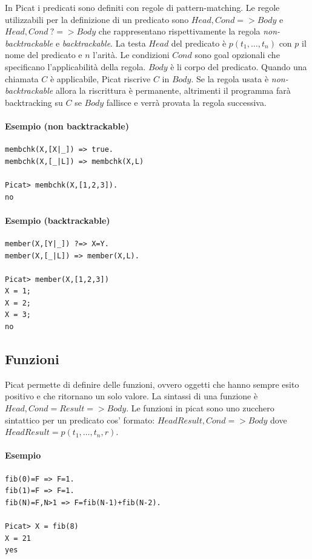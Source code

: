 \documentclass[12pt,a4paper,openright]{book} %
\begin{document}
In Picat i predicati sono definiti con regole di pattern-matching. Le regole utilizzabili per la definizione di un predicato sono $Head, Cond => Body$ e $Head, Cond\ ?=> Body$ che rappresentano rispettivamente la regola \emph{non-backtrackable} e \emph{backtrackable}. La testa $Head$ del predicato è $p(t_1, \ldots, t_n)$ con $p$ il nome del predicato e $n$ l'arità. Le condizioni $Cond$ sono goal opzionali che specificano l'applicabilità della regola. $Body$ è li corpo del predicato.
Quando una chiamata $C$ è applicabile, Picat riscrive $C$ in $Body$. Se la regola usata è \emph{non-backtrackable} allora la riscrittura è permanente, altrimenti il programma farà backtracking su $C$ se $Body$ fallisce e verrà provata la regola successiva.



\paragraph{Esempio (non backtrackable)}
\begin{verbatim}
membchk(X,[X|_]) => true.
membchk(X,[_|L]) => membchk(X,L)

Picat> membchk(X,[1,2,3]).
no
\end{verbatim}

\paragraph{Esempio (backtrackable)}
\begin{verbatim}
member(X,[Y|_]) ?=> X=Y.
member(X,[_|L]) => member(X,L).

Picat> member(X,[1,2,3])
X = 1;
X = 2;
X = 3;
no
\end{verbatim}

\subsection{Funzioni}
\label{sec:picat_base_func}

Picat permette di definire delle funzioni, ovvero oggetti che hanno sempre esito positivo e che ritornano un solo valore. La sintassi di una funzione è $Head, Cond = Result => Body$. Le funzioni in picat sono uno zucchero sintattico per un predicato cos' formato: $HeadResult, Cond => Body$ dove $HeadResult = p(t_1, \ldots, t_n, r)$.

\paragraph{Esempio}
\begin{verbatim}
fib(0)=F => F=1.
fib(1)=F => F=1.
fib(N)=F,N>1 => F=fib(N-1)+fib(N-2).

Picat> X = fib(8) 
X = 21
yes
\end{verbatim}
\end{document}
